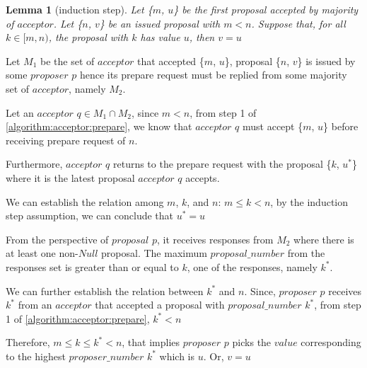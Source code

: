 \documentclass{article}
\newtheorem{lemma}{Lemma}
\begin{document}
    \begin{lemma}[induction step]
    Let \{$m$, $u$\} be the first proposal accepted by majority of $acceptor$.
    Let \{$n$, $v$\} be an issued proposal with $m < n$.
    Suppose that, for all $k \in [m, n)$, the proposal with $k$ has value $u$, then $v = u$
    \end{lemma}
    
    Let $M_1$ be the set of $acceptor$ that accepted \{$m$, $u$\}, proposal \{$n$, $v$\} is issued by some $proposer$ $p$ hence its prepare request must be replied from some majority set of $acceptor$, namely $M_2$.
    
    Let an $acceptor$ $q \in M_1 \cap M_2$, since $m < n$, from step 1 of \ref{algorithm:acceptor:prepare}, we know that $acceptor$ $q$ must accept \{$m$, $u$\} before receiving prepare request of $n$.
    
    Furthermore, $acceptor$ $q$ returns to the prepare request with the proposal \{$k$, $u^*$\} where it is the latest proposal $acceptor$ $q$ accepts.
    
    We can establish the relation among $m$, $k$, and $n$: $m \leq k < n$, by the induction step assumption, we can conclude that $u^* = u$
    
    From the perspective of $proposal$ $p$, it receives responses from $M_2$ where there is at least one non-$Null$ proposal. The maximum $proposal\_number$ from the responses set is greater than or equal to $k$, one of the responses, namely $k^*$.
    
    We can further establish the relation between $k^*$ and $n$. Since, $proposer$ $p$ receives $k^*$ from an $acceptor$ that accepted a proposal with $proposal\_number$ $k^*$, from step 1 of \ref{algorithm:acceptor:prepare}, $k^* < n$
    
    Therefore, $m \leq k \leq k^* < n$, that implies $proposer$ $p$ picks the $value$ corresponding to the highest $proposer\_number$ $k^*$ which is $u$. Or, $v = u$



\end{document}
